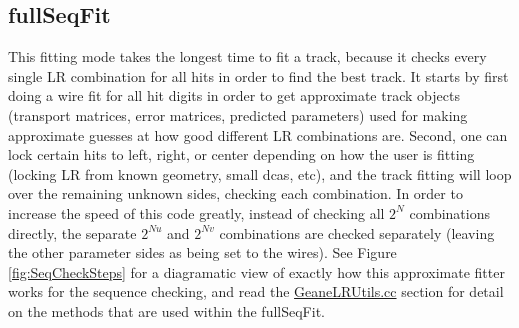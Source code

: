 	\subsection{fullSeqFit}

      This fitting mode takes the longest time to fit a track, because it checks every single LR combination for all hits in order to find the best track. It starts by first doing a wire fit for all hit digits in order to get approximate track objects (transport matrices, error matrices, predicted parameters) used for making approximate guesses at how good different LR combinations are. Second, one can lock certain hits to left, right, or center depending on how the user is fitting (locking LR from known geometry, small dcas, etc), and the track fitting will loop over the remaining unknown sides, checking each combination. In order to increase the speed of this code greatly, instead of checking all $2^{N}$ combinations directly, the separate $2^{Nu}$ and $2^{Nv}$ combinations are checked separately (leaving the other parameter sides as being set to the wires). See Figure \ref{fig:SeqCheckSteps} for a diagramatic view of exactly how this approximate fitter works for the sequence checking, and read the \hyperref[sec:GeaneLRUtils]{GeaneLRUtils.cc} section for detail on the methods that are used within the fullSeqFit.

